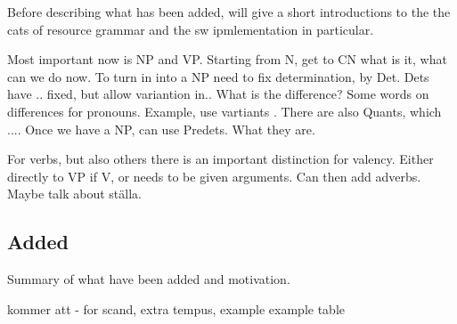 \documentclass{report}
\begin{document}
Before describing what has been added, will give a short introductions to the
the cats of resource grammar and the sw ipmlementation in particular.

Most important now is NP and VP.
Starting from N, get to CN what is it, what can we do now.
To turn in into a NP need to fix determination, by Det. Dets have .. fixed,
but allow variantion in.. 
What is the difference? Some words on differences for pronouns.
Example, use vartiants {}.
There are also Quants, which .... 
Once we have a NP, can use Predets. What they are.

For verbs, but also others there is an important distinction for valency.
Either directly to VP if V, or needs to be given arguments. Can then add adverbs.
Maybe talk about ställa.



\subsection{Added}
Summary of what have been added and motivation.

kommer att - for scand, extra tempus, example
example table
\end{document}
